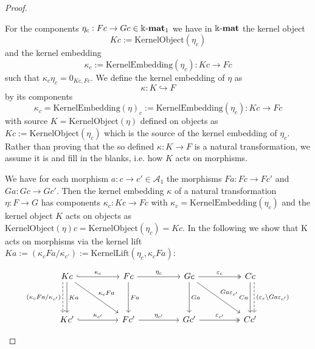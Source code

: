 \begin{proof}
\begin{enumerate}
\begin{subproof}[Proof of (ii)]
For the components $\eta_{c} : Fc \rightarrow Gc \in \Bbbk\textnormal{-}\mathbf{mat}_{1}$ we have in $\Bbbk\textnormal{-}\mathbf{mat}$ the kernel object
\[
Kc := \mathrm{KernelObject}(\eta_{c})
\]
and the kernel embedding
\[
\kappa_{c} := \mathrm{KernelEmbedding}(\eta_{c}) : Kc \rightarrow Fc
\]
such that
$\kappa_{c} \eta_{c} = 0_{Kc,Fc}$.
We define the kernel embedding of $\eta$ as
\[
\kappa : K \hookrightarrow F
\]
by its components
\[
\kappa_{c} = \mathrm{KernelEmbedding}(\eta)_{c} := \mathrm{KernelEmbedding}(\eta_{c}) : Kc \rightarrow Fc
\]
with source
$K = \mathrm{KernelObject}(\eta)$ defined on objects as $Kc := \mathrm{KernelObject}(\eta_{c})$ which is the source of the
kernel embedding of $\eta_{c}$.\\
Rather than proving that the so defined $\kappa : K \rightarrow F$ is a natural transformation, we assume it is and fill in the blanks, i.e. 
how $K$ acts on morphisms.

We have for each morphism $a : c \rightarrow c' \in \mathcal{A}_{1}$ the morphisms $Fa : Fc \rightarrow Fc'$ and
$Ga : Gc \rightarrow Gc'$. Then the kernel embedding $\kappa$ of a natural transformation $\eta : F \rightarrow G$ has components
$\kappa_{c} : Kc \rightarrow Fc$ with $\kappa_{c} = \mathrm{KernelEmbedding}(\eta_{c})$ and the kernel object $K$ acts on objects
as $\mathrm{KernelObject}(\eta)c = \mathrm{KernelObject}(\eta_{c}) = Kc$.
In the following we show that K acts on morphisms via the kernel lift
$Ka := (\kappa_{c}Fa/\kappa_{c'}) := \mathrm{KernelLift}(\eta_{c},\kappa_{c}Fa)$:

\[
\begin{tikzcd}
Kc \arrow[dd, "Ka"] \arrow[rr, "\kappa_{c}", hook] \arrow[rrdd, "\kappa_{c}Fa"] \arrow[dd, "(\kappa_{c}Fa/\kappa_{c'})"', dashed, shift right=2] &  & Fc \arrow[rr, "\eta_{c}"] \arrow[dd, "Fa"] &  & Gc \arrow[dd, "Ga"] \arrow[rr, "\varepsilon_{c}", two heads] \arrow[rrdd, "Ga\varepsilon_{c'}"] &  & Cc \arrow[dd, "Ca"'] \arrow[dd, "(\varepsilon_{c}\backslash Ga\varepsilon_{c'})", dashed, shift left=2] \\
                                                                                                                                                                                                       &  &                                            &  &                                                                                                                                                             &  &                                                                                                  \\
Kc' \arrow[rr, "\kappa_{c'}", hook]                                                                                                                                                                    &  & Fc' \arrow[rr, "\eta_{c'}"]                &  & Gc' \arrow[rr, "\varepsilon_{c'}", two heads]                                                                                                               &  & Cc'                                                                                             
\end{tikzcd}
\]


\end{subproof}
\end{enumerate}
\end{proof}
